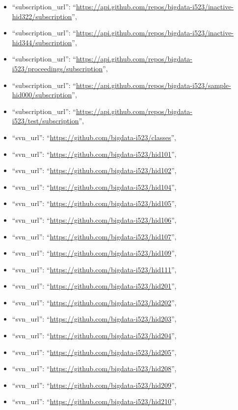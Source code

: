 \begin{itemize}
\item
  ``subscription\_url'':
  ``\url{https://api.github.com/repos/bigdata-i523/inactive-hid322/subscription}'',
\item
  ``subscription\_url'':
  ``\url{https://api.github.com/repos/bigdata-i523/inactive-hid344/subscription}'',
\item
  ``subscription\_url'':
  ``\url{https://api.github.com/repos/bigdata-i523/proceedings/subscription}'',
\item
  ``subscription\_url'':
  ``\url{https://api.github.com/repos/bigdata-i523/sample-hid000/subscription}'',
\item
  ``subscription\_url'':
  ``\url{https://api.github.com/repos/bigdata-i523/test/subscription}'',
\item
  ``svn\_url'': ``\url{https://github.com/bigdata-i523/classes}'',
\item
  ``svn\_url'': ``\url{https://github.com/bigdata-i523/hid101}'',
\item
  ``svn\_url'': ``\url{https://github.com/bigdata-i523/hid102}'',
\item
  ``svn\_url'': ``\url{https://github.com/bigdata-i523/hid104}'',
\item
  ``svn\_url'': ``\url{https://github.com/bigdata-i523/hid105}'',
\item
  ``svn\_url'': ``\url{https://github.com/bigdata-i523/hid106}'',
\item
  ``svn\_url'': ``\url{https://github.com/bigdata-i523/hid107}'',
\item
  ``svn\_url'': ``\url{https://github.com/bigdata-i523/hid109}'',
\item
  ``svn\_url'': ``\url{https://github.com/bigdata-i523/hid111}'',
\item
  ``svn\_url'': ``\url{https://github.com/bigdata-i523/hid201}'',
\item
  ``svn\_url'': ``\url{https://github.com/bigdata-i523/hid202}'',
\item
  ``svn\_url'': ``\url{https://github.com/bigdata-i523/hid203}'',
\item
  ``svn\_url'': ``\url{https://github.com/bigdata-i523/hid204}'',
\item
  ``svn\_url'': ``\url{https://github.com/bigdata-i523/hid205}'',
\item
  ``svn\_url'': ``\url{https://github.com/bigdata-i523/hid208}'',
\item
  ``svn\_url'': ``\url{https://github.com/bigdata-i523/hid209}'',
\item
  ``svn\_url'': ``\url{https://github.com/bigdata-i523/hid210}'',

\end{itemize}
